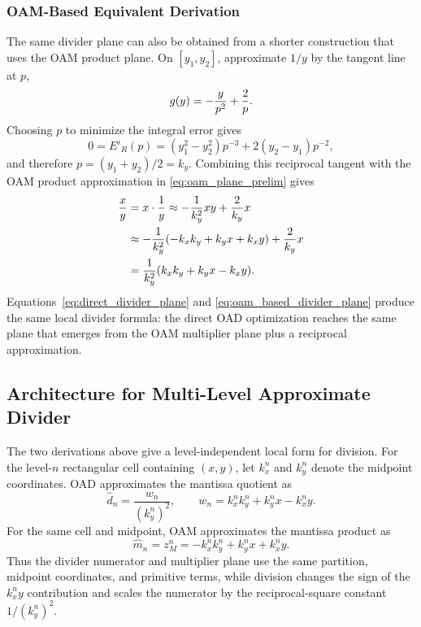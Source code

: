 \documentclass[conference]{IEEEtran}
\begin{document}
\subsubsection{OAM-Based Equivalent Derivation}
The same divider plane can also be obtained from a shorter construction that
uses the OAM product plane. On $[y_1,y_2]$, approximate $1/y$ by the tangent
line at $p$,
\begin{equation}
g(y)=-{y\over p^2}+{2\over p}.
\end{equation}
Choosing $p$ to minimize the integral error gives
\begin{equation}
0=E'_R(p)=(y_1^2-y_2^2)p^{-3}+2(y_2-y_1)p^{-2},
\end{equation}
and therefore $p=(y_1+y_2)/2=k_y$. Combining this reciprocal tangent with the
OAM product approximation in \eqref{eq:oam_plane_prelim} gives
\begin{equation}
\begin{aligned}
{x\over y}
&=x\cdot{1\over y}
\approx -{1\over k_y^2}xy+{2\over k_y}x \\
&\approx -{1\over k_y^2}(-k_xk_y+k_yx+k_xy)+{2\over k_y}x \\
&={1\over k_y^2}(k_xk_y+k_yx-k_xy).
\end{aligned}
\label{eq:oam_based_divider_plane}
\end{equation}
Equations~\eqref{eq:direct_divider_plane} and
\eqref{eq:oam_based_divider_plane} produce the same local divider formula:
the direct OAD optimization reaches the same plane that emerges from the OAM
multiplier plane plus a reciprocal approximation.

\subsection{Architecture for Multi-Level Approximate Divider}
The two derivations above give a level-independent local form for division.
For the level-$n$ rectangular cell containing $(x,y)$, let $k_x^n$ and
$k_y^n$ denote the midpoint coordinates. OAD approximates the mantissa quotient
as
\begin{equation}
 \widehat{d}_n=\frac{w_n}{(k_y^n)^2},\qquad
 w_n=k_x^nk_y^n+k_y^nx-k_x^ny. \label{eq:divplane}
\end{equation}
For the same cell and midpoint, OAM approximates the mantissa product as
\begin{equation}
 \widehat{m}_n=z_M^n=-k_x^nk_y^n+k_y^nx+k_x^ny. \label{eq:mulplane}
\end{equation}
Thus the divider numerator and multiplier plane use the same partition,
midpoint coordinates, and primitive terms, while division changes the sign of
the $k_x^ny$ contribution and scales the numerator by the reciprocal-square
constant $1/(k_y^n)^2$.
\end{document}
